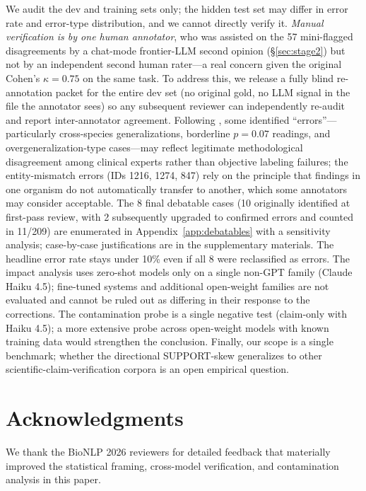 \documentclass[11pt]{article}
\begin{document}
We audit the dev and training sets only; the hidden test set may differ in error rate and error-type distribution, and we cannot directly verify it.
\emph{Manual verification is by one human annotator}, who was assisted on the 57 mini-flagged disagreements by a chat-mode frontier-LLM second opinion (\S\ref{sec:stage2}) but not by an independent second human rater---a real concern given the original Cohen's $\kappa{=}0.75$ on the same task.
To address this, we release a fully blind re-annotation packet for the entire dev set (no original gold, no LLM signal in the file the annotator sees) so any subsequent reviewer can independently re-audit and report inter-annotator agreement.
Following \citet{pavlick2019inherent}, some identified ``errors''---particularly cross-species generalizations, borderline $p{=}0.07$ readings, and overgeneralization-type cases---may reflect legitimate methodological disagreement among clinical experts rather than objective labeling failures; the entity-mismatch errors (IDs 1216, 1274, 847) rely on the principle that findings in one organism do not automatically transfer to another, which some annotators may consider acceptable.
The 8 final debatable cases (10 originally identified at first-pass review, with 2 subsequently upgraded to confirmed errors and counted in 11/209) are enumerated in Appendix~\ref{app:debatables} with a sensitivity analysis; case-by-case justifications are in the supplementary materials.
The headline error rate stays under 10\% even if all 8 were reclassified as errors.
The impact analysis uses zero-shot models only on a single non-GPT family (Claude Haiku 4.5); fine-tuned systems and additional open-weight families are not evaluated and cannot be ruled out as differing in their response to the corrections.
The contamination probe is a single negative test (claim-only with Haiku 4.5); a more extensive probe across open-weight models with known training data would strengthen the conclusion.
Finally, our scope is a single benchmark; whether the directional SUPPORT-skew generalizes to other scientific-claim-verification corpora is an open empirical question.

\section*{Acknowledgments}

We thank the BioNLP 2026 reviewers for detailed feedback that materially improved the statistical framing, cross-model verification, and contamination analysis in this paper.
\end{document}
